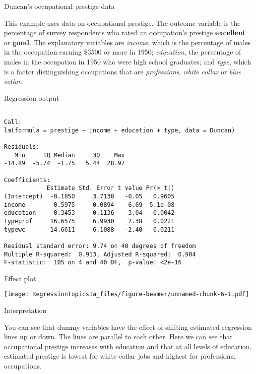 \documentclass[10pt,ignorenonframetext,]{beamer}
\begin{document}
\begin{frame}{Duncan's occupational prestige data}

This example uses data on occupational prestige. The outcome variable is
the percentage of survey respondents who rated an occupation's prestige
\textbf{excellent} or \textbf{good}. The explanatory variables are
\emph{income}, which is the percentage of males in the occupation
earning \$3500 or more in 1950; \emph{education}, the percentage of
males in the occupation in 1950 who were high school graduates; and
\emph{type}, which is a factor distinguishing occupations that are
\emph{professions}, \emph{white collar} or \emph{blue collar}.

\end{frame}

\begin{frame}[fragile]{Regression output}

\begin{verbatim}

Call:
lm(formula = prestige ~ income + education + type, data = Duncan)

Residuals:
   Min     1Q Median     3Q    Max 
-14.89  -5.74  -1.75   5.44  28.97 

Coefficients:
            Estimate Std. Error t value Pr(>|t|)
(Intercept)  -0.1850     3.7138   -0.05   0.9605
income        0.5975     0.0894    6.69  5.1e-08
education     0.3453     0.1136    3.04   0.0042
typeprof     16.6575     6.9930    2.38   0.0221
typewc      -14.6611     6.1088   -2.40   0.0211

Residual standard error: 9.74 on 40 degrees of freedom
Multiple R-squared:  0.913, Adjusted R-squared:  0.904 
F-statistic:  105 on 4 and 40 DF,  p-value: <2e-16
\end{verbatim}

\end{frame}

\begin{frame}{Effect plot}

\texttt{[image: RegressionTopics1a\_files/figure-beamer/unnamed-chunk-6-1.pdf]}

\end{frame}

\begin{frame}{Interpretation}

You can see that dummy variables have the effect of shifting estimated
regression lines up or down. The lines are parallel to each other. Here
we can see that occupational prestige increases with education and that
at all levels of education, estimated prestige is lowest for white
collar jobs and highest for professional occupations.

\end{frame}
\end{document}
